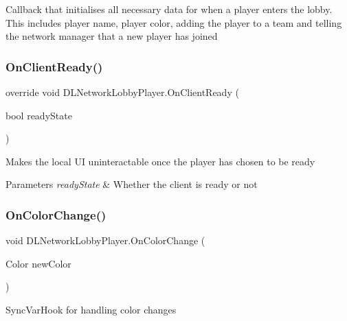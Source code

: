 Callback that initialises all necessary data for when a player enters the lobby. This includes player name, player color, adding the player to a team and telling the network manager that a new player has joined 

\hypertarget{class_d_l_network_lobby_player_a683da40a1af9342049f4221637e38356}{}\label{class_d_l_network_lobby_player_a683da40a1af9342049f4221637e38356} 
\subsubsection{\texorpdfstring{On\+Client\+Ready()}{OnClientReady()}}
{\footnotesize\ttfamily override void D\+L\+Network\+Lobby\+Player.\+On\+Client\+Ready (\begin{DoxyParamCaption}\item[{bool}]{ready\+State }\end{DoxyParamCaption})}



Makes the local UI uninteractable once the player has chosen to be ready 


\begin{DoxyParams}{Parameters}
{\em ready\+State} & Whether the client is ready or not\\
\hline
\end{DoxyParams}
\hypertarget{class_d_l_network_lobby_player_a3af013212302d6d95a0defcc9e1e33a8}{}\label{class_d_l_network_lobby_player_a3af013212302d6d95a0defcc9e1e33a8} 
\subsubsection{\texorpdfstring{On\+Color\+Change()}{OnColorChange()}}
{\footnotesize\ttfamily void D\+L\+Network\+Lobby\+Player.\+On\+Color\+Change (\begin{DoxyParamCaption}\item[{Color}]{new\+Color }\end{DoxyParamCaption})}



Sync\+Var\+Hook for handling color changes 


